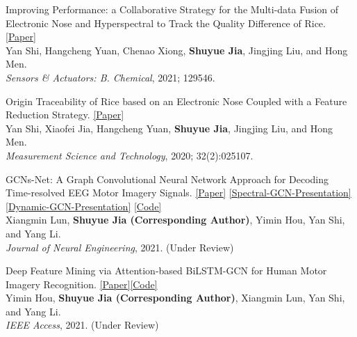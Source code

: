 \documentclass{my_cv}
\begin{document}
\hspace*{\fill} 

\workitemsone
{Improving Performance: a Collaborative Strategy for the Multi-data Fusion of Electronic Nose and Hyperspectral to Track the Quality Difference of Rice. \href{https://www.sciencedirect.com/science/article/abs/pii/S0925400521001143}{[Paper]} \\
	Yan Shi, Hangcheng Yuan, Chenao Xiong, \textbf{Shuyue Jia}, Jingjing Liu, and Hong Men.\\
	\emph{Sensors \& Actuators: B. Chemical}, 2021; 129546.}

\hspace*{\fill}

\workitemsone
{Origin Traceability of Rice based on an Electronic Nose Coupled with a Feature Reduction Strategy. \href{https://iopscience.iop.org/article/10.1088/1361-6501/abb9e7/meta}{[Paper]} \\
	Yan Shi, Xiaofei Jia, Hangcheng Yuan, \textbf{Shuyue Jia}, Jingjing Liu, and Hong Men.\\
	\emph{Measurement Science and Technology}, 2020; 32(2):025107.}

\hspace*{\fill}

\workitemsone
{GCNs-Net: A Graph Convolutional Neural Network Approach for Decoding Time-resolved EEG Motor Imagery Signals. \href{https://arxiv.org/abs/2006.08924}{[Paper]} \href{https://drive.google.com/file/d/1ecMbtZV2eH14sRAqWIIf1iRvDAC7DMDs/view}{[Spectral-GCN-Presentation]} \href{https://github.com/SuperBruceJia/paper-reading/raw/master/Graph-Neural-Network/Dynamic-GCN-Survey.pptx}{[Dynamic-GCN-Presentation]} \href{https://github.com/SuperBruceJia/EEG-DL}{[Code]}\\
	Xiangmin Lun, \textbf{Shuyue Jia (Corresponding Author)}, Yimin Hou, Yan Shi, and Yang Li.\\
	\emph{Journal of Neural Engineering}, 2021. (Under Review)}

\hspace*{\fill} 

\workitemsone
{Deep Feature Mining via Attention-based BiLSTM-GCN for Human Motor Imagery Recognition. \href{https://arxiv.org/abs/2005.00777}{[Paper]}\href{https://github.com/SuperBruceJia/EEG-DL}{[Code]}\\
	Yimin Hou, \textbf{Shuyue Jia (Corresponding Author)}, Xiangmin Lun, Yan Shi, and Yang Li.\\
	\emph{IEEE Access}, 2021. (Under Review)}
\end{document}
